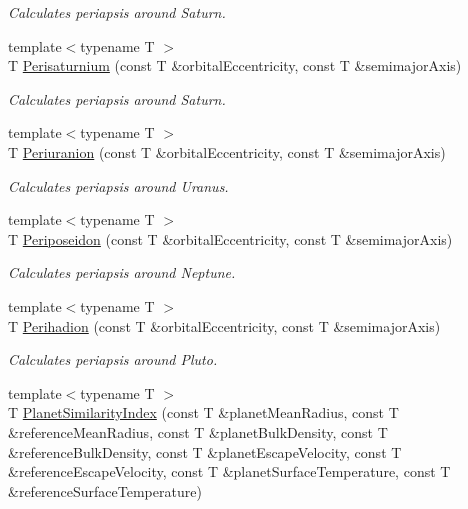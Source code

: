 \begin{DoxyCompactItemize}
\begin{DoxyCompactList}\small\item\em Calculates periapsis around Saturn. \end{DoxyCompactList}\item 
{\footnotesize template$<$typename T $>$ }\\T \hyperlink{group___periapsis_ga60a50d09d29ebe47cbbfc125c2ea42bf}{Perisaturnium} (const T \&orbital\+Eccentricity, const T \&semimajor\+Axis)
\begin{DoxyCompactList}\small\item\em Calculates periapsis around Saturn. \end{DoxyCompactList}\item 
{\footnotesize template$<$typename T $>$ }\\T \hyperlink{group___periapsis_gab8b8131a617dd2d2a4de1d48accd7442}{Periuranion} (const T \&orbital\+Eccentricity, const T \&semimajor\+Axis)
\begin{DoxyCompactList}\small\item\em Calculates periapsis around Uranus. \end{DoxyCompactList}\item 
{\footnotesize template$<$typename T $>$ }\\T \hyperlink{group___periapsis_ga237e7af3794202c67e65f64f4c8abc2a}{Periposeidon} (const T \&orbital\+Eccentricity, const T \&semimajor\+Axis)
\begin{DoxyCompactList}\small\item\em Calculates periapsis around Neptune. \end{DoxyCompactList}\item 
{\footnotesize template$<$typename T $>$ }\\T \hyperlink{group___periapsis_gafb16e46e55078b38604eef0d7c7c40c4}{Perihadion} (const T \&orbital\+Eccentricity, const T \&semimajor\+Axis)
\begin{DoxyCompactList}\small\item\em Calculates periapsis around Pluto. \end{DoxyCompactList}\item 
{\footnotesize template$<$typename T $>$ }\\T \hyperlink{group___astrophysics_ga62e8b781c301df60bd04af3183a965eb}{Planet\+Similarity\+Index} (const T \&planet\+Mean\+Radius, const T \&reference\+Mean\+Radius, const T \&planet\+Bulk\+Density, const T \&reference\+Bulk\+Density, const T \&planet\+Escape\+Velocity, const T \&reference\+Escape\+Velocity, const T \&planet\+Surface\+Temperature, const T \&reference\+Surface\+Temperature)

\end{DoxyCompactItemize}
